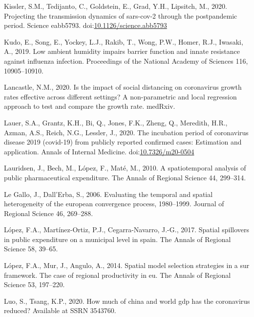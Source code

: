 \documentclass[]{elsarticle} %
\begin{document}
\leavevmode\hypertarget{ref-Kissler2020projecting}{}%
Kissler, S.M., Tedijanto, C., Goldstein, E., Grad, Y.H., Lipsitch, M.,
2020. Projecting the transmission dynamics of sars-cov-2 through the
postpandemic period. Science eabb5793.
doi:\href{https://doi.org/10.1126/science.abb5793}{10.1126/science.abb5793}

\leavevmode\hypertarget{ref-Kudo2019low}{}%
Kudo, E., Song, E., Yockey, L.J., Rakib, T., Wong, P.W., Homer, R.J.,
Iwasaki, A., 2019. Low ambient humidity impairs barrier function and
innate resistance against influenza infection. Proceedings of the
National Academy of Sciences 116, 10905--10910.

\leavevmode\hypertarget{ref-Lancastle2020impact}{}%
Lancastle, N.M., 2020. Is the impact of social distancing on coronavirus
growth rates effective across different settings? A non-parametric and
local regression approach to test and compare the growth rate. medRxiv.

\leavevmode\hypertarget{ref-Lauer2020incubation}{}%
Lauer, S.A., Grantz, K.H., Bi, Q., Jones, F.K., Zheng, Q., Meredith,
H.R., Azman, A.S., Reich, N.G., Lessler, J., 2020. The incubation period
of coronavirus disease 2019 (covid-19) from publicly reported confirmed
cases: Estimation and application. Annals of Internal Medicine.
doi:\href{https://doi.org/10.7326/m20-0504}{10.7326/m20-0504}

\leavevmode\hypertarget{ref-Lauridsen2010spatiotemporal}{}%
Lauridsen, J., Bech, M., López, F., Maté, M., 2010. A spatiotemporal
analysis of public pharmaceutical expenditure. The Annals of Regional
Science 44, 299--314.

\leavevmode\hypertarget{ref-Legallo2006evaluating}{}%
Le Gallo, J., Dall'Erba, S., 2006. Evaluating the temporal and spatial
heterogeneity of the european convergence process, 1980--1999. Journal
of Regional Science 46, 269--288.

\leavevmode\hypertarget{ref-Lopez2017spatial}{}%
López, F.A., Martínez-Ortiz, P.J., Cegarra-Navarro, J.-G., 2017. Spatial
spillovers in public expenditure on a municipal level in spain. The
Annals of Regional Science 58, 39--65.

\leavevmode\hypertarget{ref-Lopez2014spatial}{}%
López, F.A., Mur, J., Angulo, A., 2014. Spatial model selection
strategies in a sur framework. The case of regional productivity in eu.
The Annals of Regional Science 53, 197--220.

\leavevmode\hypertarget{ref-Luo2020how}{}%
Luo, S., Tsang, K.P., 2020. How much of china and world gdp has the
coronavirus reduced? Available at SSRN 3543760.
\end{document}
